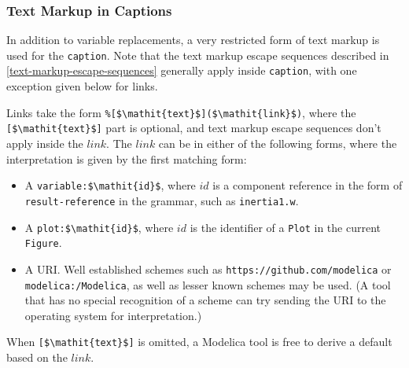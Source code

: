 \subsubsection{Text Markup in Captions}\label{text-markup-in-captions}

In addition to variable replacements, a very restricted form of text markup is used for the \lstinline!caption!.
Note that the text markup escape sequences described in \cref{text-markup-escape-sequences} generally apply inside \lstinline!caption!, with one exception given below for links.

Links take the form \lstinline!%[$\mathit{text}$]($\mathit{link}$)!, where the \lstinline![$\mathit{text}$]! part is optional, and text markup escape sequences don't apply inside the $\mathit{link}$.
The $\mathit{link}$ can be in either of the following forms, where the interpretation is given by the first matching form:
\begin{itemize}
\item
A \lstinline!variable:$\mathit{id}$!, where $\mathit{id}$ is a component reference in the form of \lstinline[language=grammar]!result-reference! in the grammar, such as \lstinline!inertia1.w!.
\item
A \lstinline!plot:$\mathit{id}$!, where $\mathit{id}$ is the identifier of a \lstinline!Plot! in the current \lstinline!Figure!.
\item
A URI.
Well established schemes such as \lstinline[language={[nocomment]modelica}]!https://github.com/modelica! or \lstinline[language={[nocomment]modelica}]!modelica:/Modelica!, as well as lesser known schemes may be used.
(A tool that has no special recognition of a scheme can try sending the URI to the operating system for interpretation.)
\end{itemize}

When \lstinline![$\mathit{text}$]! is omitted, a Modelica tool is free to derive a default based on the $\mathit{link}$.

